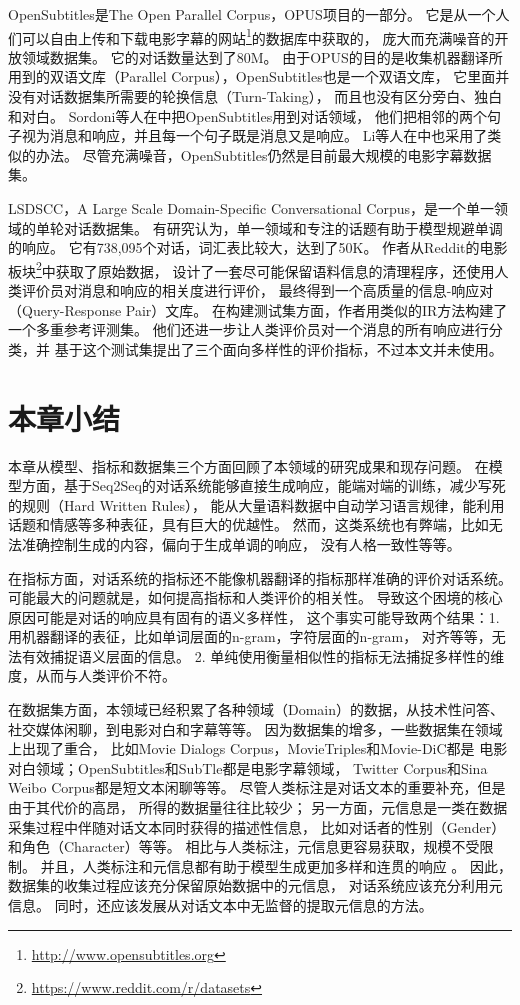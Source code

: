 OpenSubtitles是The Open Parallel Corpus，OPUS项目的一部分。
它是从一个人们可以自由上传和下载电影字幕的网站\footnote{\url{http://www.opensubtitles.org}}的数据库中获取的，
庞大而充满噪音的开放领域数据集。
它的对话数量达到了80M。
由于OPUS的目的是收集机器翻译所用到的双语文库（Parallel Corpus），OpenSubtitles也是一个双语文库，
它里面并没有对话数据集所需要的轮换信息（Turn-Taking），
而且也没有区分旁白、独白和对白。
Sordoni等人在中把OpenSubtitles用到对话领域，
他们把相邻的两个句子视为消息和响应，并且每一个句子既是消息又是响应。
Li等人在中也采用了类似的办法。
尽管充满噪音，OpenSubtitles仍然是目前最大规模的电影字幕数据集。

LSDSCC，A Large Scale Domain-Specific Conversational Corpus，是一个单一领域的单轮对话数据集。
有研究认为，单一领域和专注的话题有助于模型规避单调的响应。
它有738,095个对话，词汇表比较大，达到了50K。
作者从Reddit的电影板块\footnote{\url{https://www.reddit.com/r/datasets}}中获取了原始数据，
设计了一套尽可能保留语料信息的清理程序，还使用人类评价员对消息和响应的相关度进行评价，
最终得到一个高质量的信息-响应对（Query-Response Pair）文库。
在构建测试集方面，作者用类似的IR方法构建了一个多重参考评测集。
他们还进一步让人类评价员对一个消息的所有响应进行分类，并
基于这个测试集提出了三个面向多样性的评价指标，不过本文并未使用。

\section{本章小结}\label{sec:rw_conclusion}
本章从模型、指标和数据集三个方面回顾了本领域的研究成果和现存问题。
在模型方面，基于Seq2Seq的对话系统能够直接生成响应，能端对端的训练，减少写死的规则（Hard Written Rules），
能从大量语料数据中自动学习语言规律，能利用话题和情感等多种表征，具有巨大的优越性。
然而，这类系统也有弊端，比如无法准确控制生成的内容，偏向于生成单调的响应，
没有人格一致性等等。

在指标方面，对话系统的指标还不能像机器翻译的指标那样准确的评价对话系统。
可能最大的问题就是，如何提高指标和人类评价的相关性。
导致这个困境的核心原因可能是对话的响应具有固有的语义多样性，
这个事实可能导致两个结果：1. 用机器翻译的表征，比如单词层面的n-gram，字符层面的n-gram，
对齐等等，无法有效捕捉语义层面的信息。
2. 单纯使用衡量相似性的指标无法捕捉多样性的维度，从而与人类评价不符。

在数据集方面，本领域已经积累了各种领域（Domain）的数据，从技术性问答、社交媒体闲聊，到电影对白和字幕等等。
因为数据集的增多，一些数据集在领域上出现了重合，
比如Movie Dialogs Corpus，MovieTriples和Movie-DiC都是
电影对白领域；OpenSubtitles和SubTle都是电影字幕领域，
Twitter Corpus和Sina Weibo Corpus都是短文本闲聊等等。
尽管人类标注是对话文本的重要补充，但是由于其代价的高昂，
所得的数据量往往比较少；
另一方面，元信息是一类在数据采集过程中伴随对话文本同时获得的描述性信息，
比如对话者的性别（Gender）和角色（Character）等等。
相比与人类标注，元信息更容易获取，规模不受限制。
并且，人类标注和元信息都有助于模型生成更加多样和连贯的响应
。
因此，数据集的收集过程应该充分保留原始数据中的元信息，
对话系统应该充分利用元信息。
同时，还应该发展从对话文本中无监督的提取元信息的方法。
